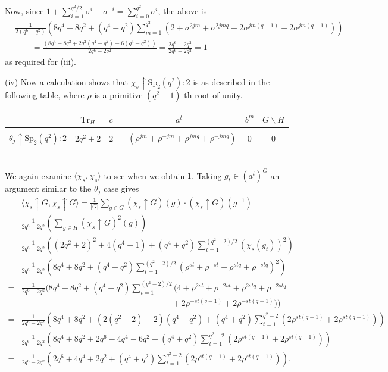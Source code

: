\documentclass[10pt,a4paper]{amsart}
\theoremstyle{plain}
\theoremstyle{definition}
\numberwithin{equation}{section}
\begin{document}
Now, since $1+\sum_{i=1}^{q^2/2} \sigma^i+\sigma^{-i}=\sum_{i=0}^{q^2} \sigma^i$,  the above  is
\begin{align*}&
\frac{1}{2(q^6-q^2)}\left(8q^4-8q^2+(q^4-q^2)\sum_{m=1}^{q^2}\left(
2+\sigma^{2jm}+\sigma^{2jmq}+2\sigma^{jm(q+1)}+2\sigma^{jm(q-1)}
\right)\right)\\&\qquad = 
\frac{(8q^4-8q^2+2q^2(q^4-q^2)-6(q^4-q^2))}{2q^6-2q^2} = \frac{2q^6-2q^2}{2q^6-2q^2} = 1
\end{align*}
as required for (iii). 
\medskip


\noindent (iv) 
Now a calculation shows that $\chi_s \uparrow \mathrm{Sp}_2(q^2)\colon 2$ 
is as  described in the following  table, where $\rho$ is a primitive $(q^2-1)$-th root of unity. 
\\[5mm]
\begin{tabular}{c|ccccc}
 & $\text{Tr}_H$ & $c$ & $a^t$ & $b^m$ & $G \smallsetminus H$\\
\hline\\
$\theta_j \uparrow \mathrm{Sp}_2(q^2)\colon 2$ & $2q^2+2$ & $2$ &  $-(\rho^{jm} + \rho^{-jm}+\rho^{jmq} + \rho^{-jmq})$ &$0$  & $0$
\end{tabular}
\\[5mm]
We again examine $\langle \chi_s,\chi_s\rangle$ to see when we obtain $1$.
 Taking $g_t\in (a^t)^G$ an argument similar to the $\theta_j$ case gives   
 \begin{align*}
 &\langle \chi_s\uparrow G, \chi_s  \uparrow G\rangle
 =\frac{1}{|G|} \sum_{g\in G} \left(\chi_s\uparrow G\right)(g)\cdot\left(\chi_s\uparrow G\right)\left(g^{-1}\right)\\
 =&\frac{1}{2q^6-2q^2}\left(\sum_{g\in H} \left(\chi_s\uparrow G\right)^2(g)\right)\\
 =&\frac{1}{2q^6-2q^2}\left((2q^2+2)^2 + 4(q^4-1) + (q^4+q^2)\sum_{t=1}^{(q^2-2)/2}\left(\chi_s(g_t)\right)^2\right)\\
 =&\frac{1}{2q^6-2q^2}\left(8q^4+8q^2 + (q^4+q^2)\sum_{t=1}^{(q^2-2)/2}\left(\rho^{st} + \rho^{-st} + \rho^{stq} + \rho^{-stq}\right)^2\right)\\
 =&\frac{1}{2q^6-2q^2}\Bigg(8q^4+8q^2 + (q^4+q^2)\sum_{t=1}^{(q^2-2)/2}\Big(4+\rho^{2st} + \rho^{-2st} + \rho^{2stq} + \rho^{-2stq}\\
  &\qquad \qquad\qquad\qquad\qquad\qquad\qquad\qquad\qquad + 2\rho^{-st(q-1)} + 2\rho^{-st(q+1)}\Big)\Bigg)\\
 =& \frac{1}{2q^6-2q^2}\left(8q^4+8q^2 + \left(2(q^2-2)-2\right)(q^4+q^2) + (q^4+q^2)\sum_{t=1}^{q^2-2}(2\rho^{st(q+1)} + 2\rho^{st(q-1)})\right)\\
 =& \frac{1}{2q^6-2q^2}\left(8q^4+8q^2 + 2q^6-4q^4-6q^2 +  (q^4+q^2)\sum_{t=1}^{q^2-2}(2\rho^{st(q+1)} + 2\rho^{st(q-1)})\right)\\
 =& \frac{1}{2q^6-2q^2}\left(2q^6+4q^4+2q^2 +  (q^4+q^2)\sum_{t=1}^{q^2-2}(2\rho^{st(q+1)} + 2\rho^{st(q-1)})\right).
 \end{align*}
\end{document}
